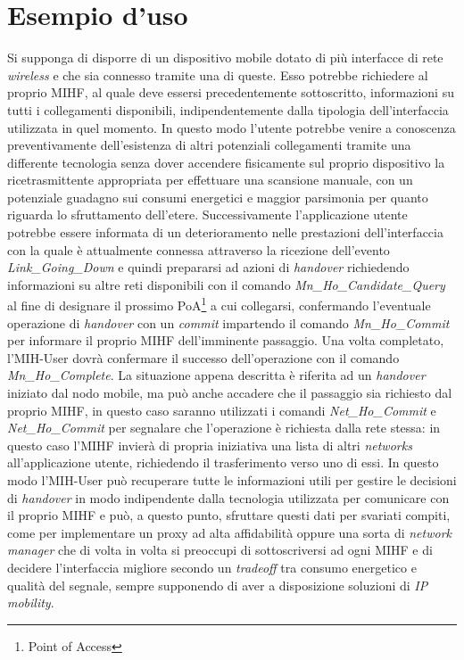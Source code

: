 \section{Esempio d'uso}
Si supponga di disporre di un dispositivo mobile dotato di più interfacce di rete {\em wireless} e che sia connesso tramite una di queste. Esso potrebbe richiedere al proprio MIHF, al quale deve essersi precedentemente sottoscritto, informazioni su tutti i  collegamenti disponibili, indipendentemente dalla tipologia dell'interfaccia utilizzata in quel momento. In questo modo l'utente potrebbe venire a conoscenza preventivamente dell'esistenza di altri potenziali collegamenti tramite una differente tecnologia senza dover accendere fisicamente sul proprio dispositivo la ricetrasmittente appropriata per effettuare una scansione manuale, con un potenziale guadagno sui consumi energetici e maggior parsimonia per quanto riguarda lo sfruttamento dell'etere. Successivamente l'applicazione utente potrebbe essere informata di un deterioramento nelle prestazioni dell'interfaccia con la quale è attualmente connessa attraverso la ricezione dell'evento {\em Link\_Going\_Down} e quindi prepararsi ad azioni di {\em handover} richiedendo informazioni su altre reti disponibili con il comando {\em Mn\_Ho\_Candidate\_Query} al fine di designare il prossimo PoA\footnote{Point of Access} a cui collegarsi, confermando l'eventuale operazione di {\em handover} con un {\em commit} impartendo il comando {\em Mn\_Ho\_Commit} per informare il proprio MIHF dell'imminente passaggio. Una volta completato, l'MIH-User dovrà confermare il successo dell'operazione con il comando {\em Mn\_Ho\_Complete}. La situazione appena descritta è riferita ad un {\em handover} iniziato dal nodo mobile, ma può anche accadere che il passaggio sia richiesto dal proprio MIHF, in questo caso saranno utilizzati i comandi {\em Net\_Ho\_Commit} e {\em Net\_Ho\_Commit} per segnalare che l'operazione è richiesta dalla rete stessa: in questo caso l'MIHF invierà di propria iniziativa una lista di altri {\em networks} all'applicazione utente, richiedendo il trasferimento verso uno di essi. In questo modo l'MIH-User può recuperare tutte le informazioni utili per gestire le decisioni di {\em handover} in modo indipendente dalla tecnologia utilizzata per comunicare con il proprio MIHF e può, a questo punto, sfruttare questi dati per svariati compiti, come per implementare un proxy ad alta affidabilità oppure una sorta di {\em network manager} che di volta in volta si preoccupi di sottoscriversi ad ogni MIHF e di decidere l'interfaccia migliore secondo un {\em tradeoff} tra consumo energetico e qualità del segnale, sempre supponendo di aver a disposizione soluzioni di {\em IP mobility}.

